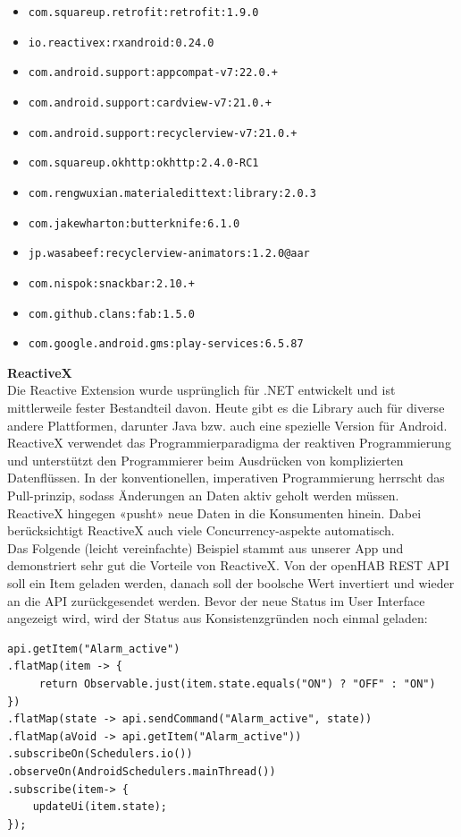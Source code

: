 \begin{itemize}
	\item \lstinline!com.squareup.retrofit:retrofit:1.9.0!
    \item \lstinline!io.reactivex:rxandroid:0.24.0!
    \item \lstinline!com.android.support:appcompat-v7:22.0.+!
    \item \lstinline!com.android.support:cardview-v7:21.0.+!
    \item \lstinline!com.android.support:recyclerview-v7:21.0.+!
    \item \lstinline!com.squareup.okhttp:okhttp:2.4.0-RC1!
    \item \lstinline!com.rengwuxian.materialedittext:library:2.0.3!
    \item \lstinline!com.jakewharton:butterknife:6.1.0!
    \item \lstinline!jp.wasabeef:recyclerview-animators:1.2.0@aar!
    \item \lstinline!com.nispok:snackbar:2.10.+!
    \item \lstinline!com.github.clans:fab:1.5.0!
    \item \lstinline!com.google.android.gms:play-services:6.5.87!
\end{itemize}


\textbf{ReactiveX} \\
Die Reactive Extension wurde usprünglich für .NET entwickelt und ist mittlerweile fester Bestandteil davon. Heute gibt es die Library auch für diverse andere Plattformen, darunter Java bzw. auch eine spezielle Version für Android. ReactiveX verwendet das Programmierparadigma der reaktiven Programmierung und unterstützt den Programmierer beim Ausdrücken von komplizierten Datenflüssen. In der konventionellen, imperativen Programmierung herrscht das Pull-prinzip, sodass Änderungen an Daten aktiv geholt werden müssen. ReactiveX hingegen «pusht» neue Daten in die Konsumenten hinein. Dabei berücksichtigt ReactiveX auch viele Concurrency-aspekte automatisch.\\

Das Folgende (leicht vereinfachte) Beispiel stammt aus unserer App und demonstriert sehr gut die Vorteile von ReactiveX. Von der openHAB REST API soll ein Item geladen werden, danach soll der boolsche Wert invertiert und wieder an die API zurückgesendet werden. Bevor der neue Status im User Interface angezeigt wird, wird der Status aus Konsistenzgründen noch einmal geladen:
\pagebreak
\begin{lstlisting}[style=csharp, label={lst:reactiveXSample}, caption=ReactiveX Beispiel]
api.getItem("Alarm_active")
.flatMap(item -> {
	 return Observable.just(item.state.equals("ON") ? "OFF" : "ON")
})
.flatMap(state -> api.sendCommand("Alarm_active", state))
.flatMap(aVoid -> api.getItem("Alarm_active"))
.subscribeOn(Schedulers.io())
.observeOn(AndroidSchedulers.mainThread())
.subscribe(item-> {
	updateUi(item.state);
});
\end{lstlisting}

